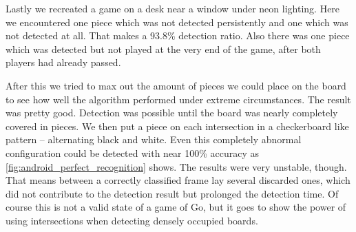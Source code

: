 	Lastly we recreated a game on a desk near a window under neon lighting. Here we encountered one piece which was not detected persistently and one which was not detected at all. That makes a 93.8\% detection ratio. Also there was one piece which was detected but not played at the very end of the game, after both players had already passed.

	After this we tried to max out the amount of pieces we could place on the board to see how well the algorithm performed under extreme circumstances. The result was pretty good. Detection was possible until the board was nearly completely covered in pieces. We then put a piece on each intersection in a checkerboard like pattern -- alternating black and white. Even this completely abnormal configuration could be detected with near 100\% accuracy as \autoref{fig:android_perfect_recognition} shows. The results were very unstable, though. That means between a correctly classified frame lay several discarded ones, which did not contribute to the detection result but prolonged the detection time. Of course this is not a valid state of a game of Go, but it goes to show the power of using intersections when detecting densely occupied boards.
